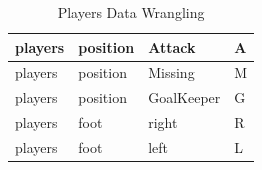 \documentclass{Configuration_Files/PoliMi3i_thesis}
\begin{document}
\begin{table}[ht]
\begin{tabular}{|l|l|l|l|}
		players                   & position           & Attack             & A                  \\ \hline
		players                   & position           & Missing            & M                  \\ \hline
		players                   & position           & GoalKeeper         & G                  \\ \hline
		players                   & foot               & right              & R                  \\ \hline
		players                   & foot               & left               & L                  \\ \hline
	\end{tabular}
	\caption{Players Data Wrangling}
	\label{your-label-here}
\end{table}
\newpage
\end{document}
